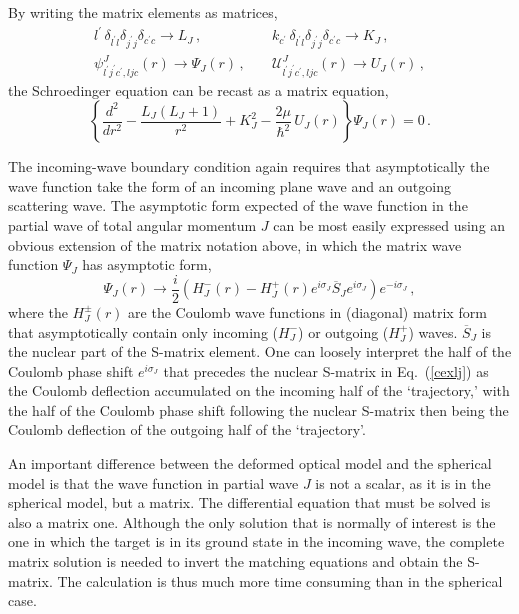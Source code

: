 \documentclass[twocolumn,amsmath,amssymb,10pt,groupedaddress,letter]{revtex4}
\begin{document}
By writing the matrix elements as matrices, \begin{eqnarray}
l^{\prime}\,\delta_{l^{\prime}l}\delta_{j^{\prime}j}\delta_{c^{\prime}c}\rightarrow L_{J}\,, & \; & k_{c^{\prime}}\,\delta_{l^{\prime}l}\delta_{j^{\prime}j}\delta_{c^{\prime}c}\rightarrow K_{J}\,,\\
\psi_{l^{\prime}j^{\prime}c^{\prime},ljc}^{J}(r)\rightarrow\Psi_{J}(r)\,, & \; & {\mathcal{U}}_{l^{\prime}j^{\prime}c^{\prime},ljc}^{J}(r)\rightarrow U_{J}(r)\,,\nonumber \end{eqnarray}
 the Schroedinger equation can be recast as
a matrix equation, \begin{equation}
\left\{ \frac{d^{2}}{dr^{2}}-\frac{L_{J}(L_{J}+1)}{r^{2}}+K_{J}^{2}-\frac{2\mu}{\hbar^{2}}\, U_{J}(r)\right\} \Psi_{J}(r)=0\,.\label{ceqj}\end{equation}

The incoming-wave boundary condition again requires that asymptotically
the wave function take the form of an incoming plane wave and an outgoing
scattering wave. The asymptotic form expected of the wave function in
the partial wave
of total angular momentum $J$ can be most easily expressed using
an obvious extension of the matrix notation above, in which the
matrix wave function $\Psi_{J}$ has asymptotic form,
\begin{equation}
\Psi_{J}(r)\rightarrow
 \frac{i}{2}\left(H_{J}^{-}(r)-H_{J}^{+}(r)e^{i\sigma_{J}}\overline{S}_{J}e^{i\sigma_{J}}\right)e^{-i\sigma_{J}}\,, \label{cexlj}\end{equation}
 where the $H_{J}^{\pm}(r)$
are the Coulomb wave functions in (diagonal)
matrix form that asymptotically contain only
incoming ($H_{J}^{-}$) or outgoing ($H_{J}^{+}$) waves. $\overline{S}_{J}$
is the nuclear part of the S-matrix element. One can loosely interpret
the half of the Coulomb phase shift $e^{i\sigma_{J}}$ that precedes
the nuclear S-matrix in Eq.~(\ref{cexlj}) as the Coulomb deflection
accumulated on the incoming half of the `trajectory,' with the half
of the Coulomb phase shift following the nuclear S-matrix then being
the Coulomb deflection of the outgoing half of the `trajectory'.

An important difference between the deformed optical model and the
spherical model is that the wave function in partial wave $J$ is
not a scalar, as it is in the spherical model, but a matrix. The differential
equation that must be solved is also a matrix one. Although the only
solution that is normally of interest is the one in which the target
is in its ground state in the incoming wave, the complete matrix solution
is needed to invert the matching equations and obtain the S-matrix.
The calculation is thus much more time consuming than in the spherical
case.
\end{document}
